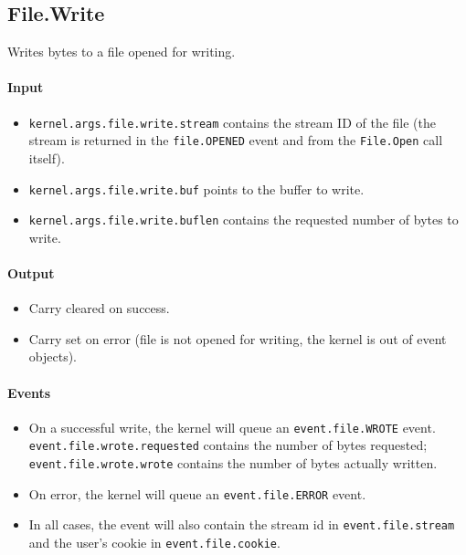 \subsection*{File.Write}
Writes bytes to a file opened for writing.

\paragraph{Input}

\begin{itemize}
\item \verb+kernel.args.file.write.stream+ contains the stream ID of the file (the stream is returned in the \verb+file.OPENED+ event and from the \verb+File.Open+ call itself).
\item \verb+kernel.args.file.write.buf+ points to the buffer to write.
\item \verb+kernel.args.file.write.buflen+ contains the requested number of bytes to write.
\end{itemize}

\paragraph{Output}

\begin{itemize}
\item Carry cleared on success.
\item Carry set on error (file is not opened for writing, the kernel is out of event objects).
\end{itemize}

\paragraph{Events}

\begin{itemize}
\item On a successful write, the kernel will queue an \verb+event.file.WROTE+ event. \\ \verb+event.file.wrote.requested+ contains the number of bytes requested; \\ \verb+event.file.wrote.wrote+ contains the number of bytes actually written.
\item On error, the kernel will queue an \verb+event.file.ERROR+ event.
\item In all cases, the event will also contain the stream id in \verb+event.file.stream+ and the user's cookie in \verb+event.file.cookie+.
\end{itemize}

